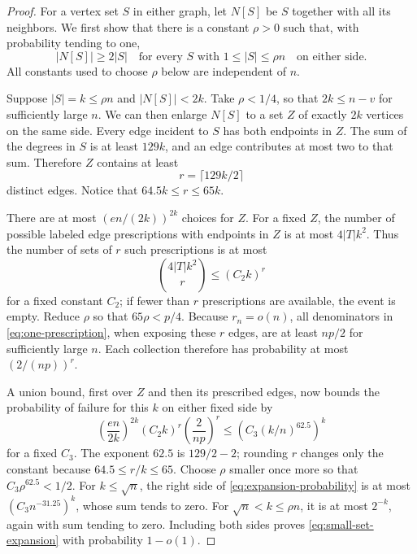 \begin{proof}
For a vertex set \(S\) in either graph, let \(N[S]\) be \(S\)
together with all its neighbors.  We first show that there is a
constant \(\rho>0\) such that, with probability tending to one,
\begin{equation}\label{eq:small-set-expansion}
 |N[S]|\ge2|S|
 \quad\text{for every }S\text{ with }1\le|S|\le\rho n
 \quad\text{on either side}.
\end{equation}
All constants used to choose \(\rho\) below are independent of \(n\).

Suppose \(|S|=k\le\rho n\) and \(|N[S]|<2k\).  Take \(\rho<1/4\),
so that \(2k\le n-v\) for sufficiently large \(n\).  We can then
enlarge \(N[S]\) to a set \(Z\) of exactly \(2k\) vertices on
the same side.  Every edge incident to \(S\) has both endpoints in
\(Z\).  The sum of the degrees in \(S\) is at least \(129k\),
and an edge contributes at most two to that sum.  Therefore \(Z\)
contains at least
\[
 r=\lceil129k/2\rceil
\]
distinct edges.  Notice that \(64.5k\le r\le65k\).

There are at most \((en/(2k))^{2k}\) choices for \(Z\).  For a
fixed \(Z\), the number of possible labeled edge prescriptions
with endpoints in \(Z\) is at most \(4|T|k^2\).  Thus the number
of sets of \(r\) such prescriptions is at most
\[
 \binom{4|T|k^2}{r}\le (C_2k)^r
\]
for a fixed constant \(C_2\); if fewer than \(r\) prescriptions
are available, the event is empty.  Reduce \(\rho\) so that
\(65\rho<p/4\).  Because \(r_n=o(n)\), all denominators in
\eqref{eq:one-prescription}, when exposing these \(r\) edges, are
at least \(np/2\) for sufficiently large \(n\).  Each collection
therefore has probability at most \((2/(np))^r\).

A union bound, first over \(Z\) and then its prescribed edges, now
bounds the probability of failure for this \(k\) on either fixed
side by
\begin{equation}\label{eq:expansion-probability}
 \left(\frac{en}{2k}\right)^{2k}
 (C_2k)^r\left(\frac2{np}\right)^r
 \le\left(C_3(k/n)^{62.5}\right)^k
\end{equation}
for a fixed \(C_3\).  The exponent \(62.5\) is
\(129/2-2\); rounding \(r\) changes only the constant because
\(64.5\le r/k\le65\).  Choose \(\rho\) smaller once more so that
\(C_3\rho^{62.5}<1/2\).  For \(k\le\sqrt n\), the right side
of \eqref{eq:expansion-probability} is at most
\((C_3n^{-31.25})^k\), whose sum tends to zero.  For
\(\sqrt n<k\le\rho n\), it is at most \(2^{-k}\), again with
sum tending to zero.  Including both sides proves
\eqref{eq:small-set-expansion} with probability \(1-o(1)\).


\end{proof}

